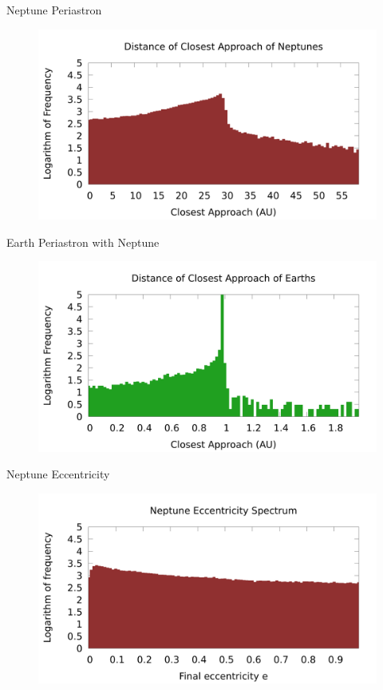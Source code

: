 \documentclass{beamer}
\begin{document}
\begin{frame}{Neptune Periastron}
    \begin{figure}
        \centering
        \includegraphics[width=4.5in]{slides/peri_neptune_n1000}
    \end{figure}
\end{frame}

\begin{frame}{Earth Periastron with Neptune}
    \begin{figure}
        \centering
        \includegraphics[width=4.5in]{slides/peri_nep_earth_n1000}
    \end{figure}
\end{frame}

\begin{frame}{Neptune Eccentricity}
    \begin{figure}
        \centering
        \includegraphics[width=4.5in]{slides/ecc_neptune_n1000}
    \end{figure}
\end{frame}
\end{document}
